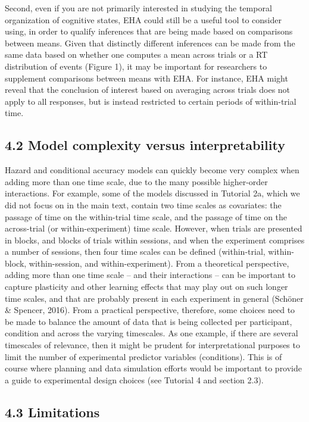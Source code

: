 \documentclass[
  english,
  man, donotrepeattitle,floatsintext]{apa6}
\begin{document}
Second, even if you are not primarily interested in studying the temporal organization of cognitive states, EHA could still be a useful tool to consider using, in order to qualify inferences that are being made based on comparisons between means. Given that distinctly different inferences can be made from the same data based on whether one computes a mean across trials or a RT distribution of events (Figure 1), it may be important for researchers to supplement comparisons between means with EHA. For instance, EHA might reveal that the conclusion of interest based on averaging across trials does not apply to all responses, but is instead restricted to certain periods of within-trial time.

\subsection{4.2 Model complexity versus interpretability}\label{model-complexity-versus-interpretability}

Hazard and conditional accuracy models can quickly become very complex when adding more than one time scale, due to the many possible higher-order interactions.
For example, some of the models discussed in Tutorial 2a, which we did not focus on in the main text, contain two time scales as covariates: the passage of time on the within-trial time scale, and the passage of time on the across-trial (or within-experiment) time scale. However, when trials are presented in blocks, and blocks of trials within sessions, and when the experiment comprises a number of sessions, then four time scales can be defined (within-trial, within-block, within-session, and within-experiment).
From a theoretical perspective, adding more than one time scale -- and their interactions -- can be important to capture plasticity and other learning effects that may play out on such longer time scales, and that are probably present in each experiment in general (Schöner \& Spencer, 2016).
From a practical perspective, therefore, some choices need to be made to balance the amount of data that is being collected per participant, condition and across the varying timescales. As one example, if there are several timescales of relevance, then it might be prudent for interpretational purposes to limit the number of experimental predictor variables (conditions).
This is of course where planning and data simulation efforts would be important to provide a guide to experimental design choices (see Tutorial 4 and section 2.3).

\subsection{4.3 Limitations}\label{limitations}
\end{document}
